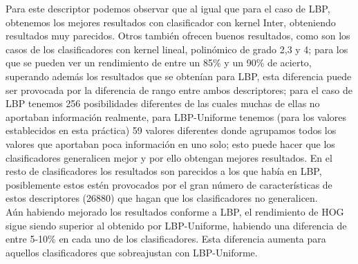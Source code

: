 Para este descriptor podemos observar que al igual que para el caso de LBP, obtenemos los mejores resultados con clasificador con kernel Inter, obteniendo resultados muy parecidos. Otros también ofrecen buenos resultados, como son los casos de los clasificadores con kernel lineal, polinómico de grado 2,3 y 4; para los que se pueden ver un rendimiento de entre un 85\% y un 90\% de acierto, superando además los resultados que se obtenían para LBP, esta diferencia puede ser provocada por la diferencia de rango entre ambos descriptores; para el caso de LBP tenemos 256 posibilidades diferentes de las cuales muchas de ellas no aportaban información realmente, para LBP-Uniforme tenemos (para los valores establecidos en esta práctica) 59 valores diferentes donde agrupamos todos los valores que aportaban poca información en uno solo; esto puede hacer que los clasificadores generalicen mejor y por ello obtengan mejores resultados. En el resto de clasificadores los resultados son parecidos a los que había en LBP, posiblemente estos estén provocados por el gran número de características de estos descriptores (26880) que hagan que los clasificadores no generalicen. \\

Aún habiendo mejorado los resultados conforme a LBP, el rendimiento de HOG sigue siendo superior al obtenido por LBP-Uniforme, habiendo una diferencia de entre 5-10\% en cada uno de los clasificadores. Esta diferencia aumenta para aquellos clasificadores que sobreajustan con LBP-Uniforme.  